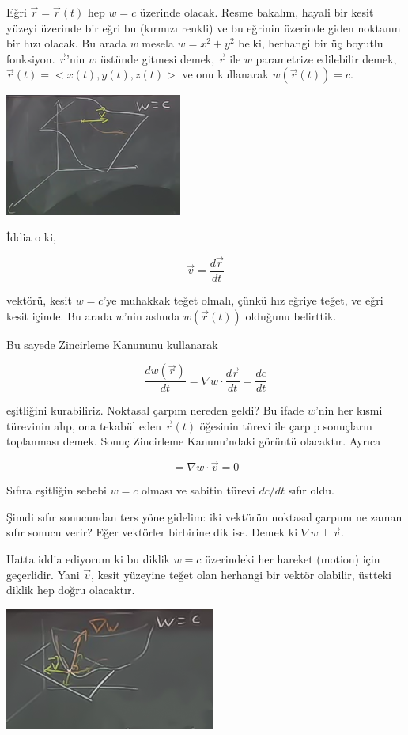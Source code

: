 \documentclass[12pt,fleqn]{article}\usepackage{../../common}
\begin{document}
Eğri $\vec{r} = \vec{r}(t)$ hep $w = c$ üzerinde olacak. Resme bakalım,
hayali bir kesit yüzeyi üzerinde bir eğri bu (kırmızı renkli) ve bu eğrinin
üzerinde giden noktanın bir hızı olacak. Bu arada $w$ mesela $w = x^2 +
y^2$ belki, herhangi bir üç boyutlu fonksiyon. $\vec{r}$'nin $w$ üstünde
gitmesi demek, $\vec{r}$ ile $w$ parametrize edilebilir demek, $\vec{r}(t)
= < x(t),y(t),z(t) >$ ve onu kullanarak $w(\vec{r}(t)) = c$.

\begin{center}
\includegraphics[height=4cm]{12_3.png}
\end{center}

İddia o ki, 

$$ \vec{v} = \frac{d\vec{r}}{dt} $$

vektörü, kesit $w = c$'ye muhakkak teğet olmalı, çünkü hız eğriye teğet, ve
eğri kesit içinde. Bu arada $w$'nin aslında $w(\vec{r}(t))$ olduğunu
belirttik.

Bu sayede Zincirleme Kanununu kullanarak 

$$ \frac{dw(\vec{r})}{dt} = \nabla w \cdot \frac{d\vec{r}}{dt} = \frac{dc}{dt}$$

eşitliğini kurabiliriz. Noktasal çarpım nereden geldi? Bu ifade $w$'nin
her kısmi türevinin alıp, ona tekabül eden $\vec{r}(t)$ öğesinin türevi ile
çarpıp sonuçların toplanması demek. Sonuç Zincirleme Kanunu'ndaki görüntü
olacaktır. Ayrıca

$$  = \nabla w \cdot \vec{v} = 0$$

Sıfıra eşitliğin sebebi $w = c$ olması ve sabitin türevi $dc/dt$ sıfır oldu. 

Şimdi sıfır sonucundan ters yöne gidelim: iki vektörün noktasal çarpımı ne zaman
sıfır sonucu verir? Eğer vektörler birbirine dik ise. Demek ki $\nabla w \perp
\vec{v}$.

Hatta iddia ediyorum ki bu diklik $w=c$ üzerindeki her hareket (motion)
için geçerlidir. Yani $\vec{v}$, kesit yüzeyine teğet olan herhangi bir
vektör olabilir, üstteki diklik hep doğru olacaktır.

\begin{center}
\includegraphics[height=4cm]{12_4.png}
\end{center}
\end{document}
